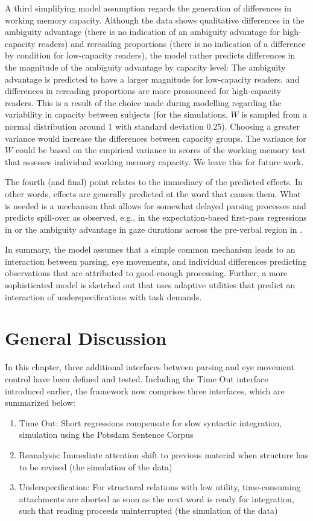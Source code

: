 \documentclass{cambridge7A}\usepackage[]{graphicx}\usepackage[]{color}
\begin{document}
A third simplifying model assumption regards the generation of differences in working memory capacity. Although the data shows qualitative differences in the ambiguity advantage (there is no indication of an ambiguity advantage for high-capacity readers) and rereading proportions (there is no indication of a difference by condition for low-capacity readers), the model rather predicts differences in the magnitude of the ambiguity advantage by capacity level: The ambiguity advantage is predicted to have a larger magnitude for low-capacity readers, and differences in rereading proportions are more pronounced for high-capacity readers. This is a result of the choice made during modelling regarding the variability in capacity between subjects (for the simulations, $W$ is sampled from a normal distribution around $1$ with standard deviation $0.25$). Choosing a greater variance would increase the differences between capacity groups. The variance for $W$ could  be based on the empirical variance in scores of the working memory test that assesses individual working memory capacity. We leave this for future work.

The fourth (and final) point relates to the  immediacy of the predicted effects. In other words, effects are generally predicted at the word that causes them. What is needed is a mechanism that allows for somewhat delayed parsing processes and predicts spill-over as observed, e.g., in the expectation-based first-pass regressions in \cite{Staub2010a} or the ambiguity advantage in gaze durations across the pre-verbal region in \cite{MalsburgVasishth2013}. 

In summary, the model assumes that a simple common mechanism leads to an interaction between parsing, eye movements, and individual differences predicting observations that are attributed to good-enough processing. Further, a more sophisticated model is sketched out that uses adaptive utilities that predict an interaction of underspecifications with task demands.


\section{General Discussion}
In this chapter, three additional interfaces between parsing and eye movement control have been defined and tested. Including the Time Out interface introduced earlier, the framework now comprises three interfaces, which are summarized below:

\begin{enumerate}
\item Time Out: Short regressions compensate for slow syntactic integration, simulation using the Potsdam Sentence Corpus
\item Reanalysis: Immediate attention shift to previous material when structure has to be revised (the simulation of the \cite{Staub2010a} data)
\item Underspecification:  For structural relations with low utility, time-consuming attachments are aborted as soon as the next word is ready for integration, such that reading proceeds uninterrupted (the simulation of the \cite{MalsburgVasishth2013} data)
\end{enumerate}
\end{document}
